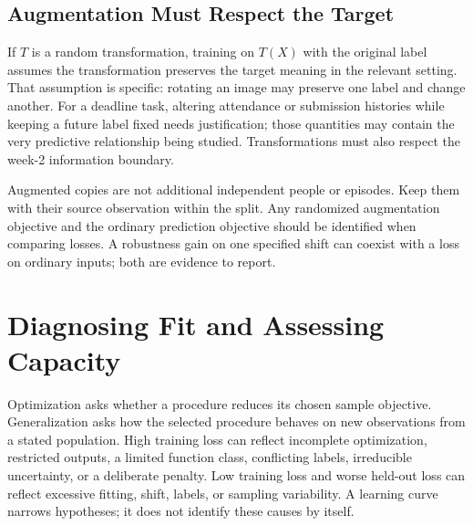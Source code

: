 \subsection{Augmentation Must Respect the Target}

If $T$ is a random transformation, training on $T(X)$ with the original label assumes the transformation preserves the target meaning in the relevant setting. That assumption is specific: rotating an image may preserve one label and change another. For a deadline task, altering attendance or submission histories while keeping a future label fixed needs justification; those quantities may contain the very predictive relationship being studied. Transformations must also respect the week-2 information boundary.

Augmented copies are not additional independent people or episodes. Keep them with their source observation within the split. Any randomized augmentation objective and the ordinary prediction objective should be identified when comparing losses. A robustness gain on one specified shift can coexist with a loss on ordinary inputs; both are evidence to report.

\section{Diagnosing Fit and Assessing Capacity}

Optimization asks whether a procedure reduces its chosen sample objective. Generalization asks how the selected procedure behaves on new observations from a stated population. High training loss can reflect incomplete optimization, restricted outputs, a limited function class, conflicting labels, irreducible uncertainty, or a deliberate penalty. Low training loss and worse held-out loss can reflect excessive fitting, shift, labels, or sampling variability. A learning curve narrows hypotheses; it does not identify these causes by itself.

